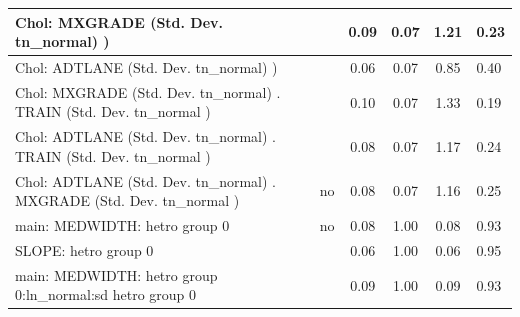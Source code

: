 \begin{table}
\begin{center}
\begin{tabular}{|l|l|c|c|c|l|}
			\hline
			 Chol: MXGRADE (Std. Dev. tn_normal) ) &  & 0.09 & 0.07 & 1.21 & 0.23 \\
			\hline
			 Chol: ADTLANE (Std. Dev. tn_normal) ) &  & 0.06 & 0.07 & 0.85 & 0.40 \\
			\hline
			 Chol: MXGRADE (Std. Dev. tn_normal) . TRAIN (Std. Dev.   tn_normal ) &  & 0.10 & 0.07 & 1.33 & 0.19 \\
			\hline
			 Chol: ADTLANE (Std. Dev. tn_normal) . TRAIN (Std. Dev.   tn_normal ) &  & 0.08 & 0.07 & 1.17 & 0.24 \\
			\hline
			 Chol: ADTLANE (Std. Dev. tn_normal) . MXGRADE (Std. Dev.   tn_normal ) & no & 0.08 & 0.07 & 1.16 & 0.25 \\
			\hline
			main: MEDWIDTH: hetro group 0 & no & 0.08 & 1.00 & 0.08 & 0.93 \\
			\hline
			SLOPE: hetro group 0 &  & 0.06 & 1.00 & 0.06 & 0.95 \\
			\hline
			main: MEDWIDTH: hetro group 0:ln_normal:sd  hetro group 0 &  & 0.09 & 1.00 & 0.09 & 0.93 \\
			\hline
		\end{tabular}
	\end{center}
\end{table}